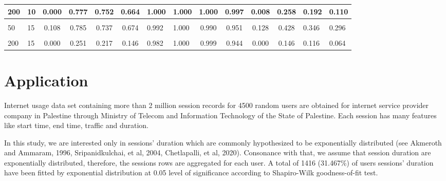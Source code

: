 \documentclass[notitlepage,12pt]{jedm}
\begin{document}
\begin{table}[H]
\begin{tabular}[t]{l|l|c|c|c|c|l|l|c|c|c|c|l|l}
\hline
200 & 10 & 0.000 & 0.777 & 0.752 & 0.664 & 1.000 & 1.000 & 1.000 & 0.997 & 0.008 & 0.258 & 0.192 & 0.110\\
\hline
\cellcolor{gray!6}{20} & \cellcolor{gray!6}{15} & \cellcolor{gray!6}{0.743} & \cellcolor{gray!6}{0.937} & \cellcolor{gray!6}{0.908} & \cellcolor{gray!6}{0.868} & \cellcolor{gray!6}{0.994} & \cellcolor{gray!6}{0.994} & \cellcolor{gray!6}{0.968} & \cellcolor{gray!6}{0.920} & \cellcolor{gray!6}{0.514} & \cellcolor{gray!6}{0.770} & \cellcolor{gray!6}{0.720} & \cellcolor{gray!6}{0.700}\\
\hline
50 & 15 & 0.108 & 0.785 & 0.737 & 0.674 & 0.992 & 1.000 & 0.990 & 0.951 & 0.128 & 0.428 & 0.346 & 0.296\\
\hline
\cellcolor{gray!6}{100} & \cellcolor{gray!6}{15} & \cellcolor{gray!6}{0.006} & \cellcolor{gray!6}{0.666} & \cellcolor{gray!6}{0.617} & \cellcolor{gray!6}{0.540} & \cellcolor{gray!6}{0.988} & \cellcolor{gray!6}{0.999} & \cellcolor{gray!6}{0.995} & \cellcolor{gray!6}{0.945} & \cellcolor{gray!6}{0.034} & \cellcolor{gray!6}{0.218} & \cellcolor{gray!6}{0.168} & \cellcolor{gray!6}{0.150}\\
\hline
200 & 15 & 0.000 & 0.251 & 0.217 & 0.146 & 0.982 & 1.000 & 0.999 & 0.944 & 0.000 & 0.146 & 0.116 & 0.064\\
\hline
\end{tabular}
\end{table}

\hypertarget{application}{%
\section{Application}\label{application}}

Internet usage data set containing more than 2 million session records
for 4500 random users are obtained for internet service provider company
in Palestine through Ministry of Telecom and Information Technology of
the State of Palestine. Each session has many features like start time,
end time, traffic and duration.

In this study, we are interested only in sessions' duration which are
commonly hypothesized to be exponentially distributed (see Akmeroth and
Ammaram, 1996, Sripanidkulchai, et al, 2004, Chetlapalli, et al, 2020).
Consonance with that, we assume that session duration are exponentially
distributed, therefore, the sessions rows are aggregated for each user.
A total of 1416 (31.467\%) of users sessions' duration have been fitted
by exponential distribution at 0.05 level of significance according to
Shapiro-Wilk goodness-of-fit test.
\end{document}
